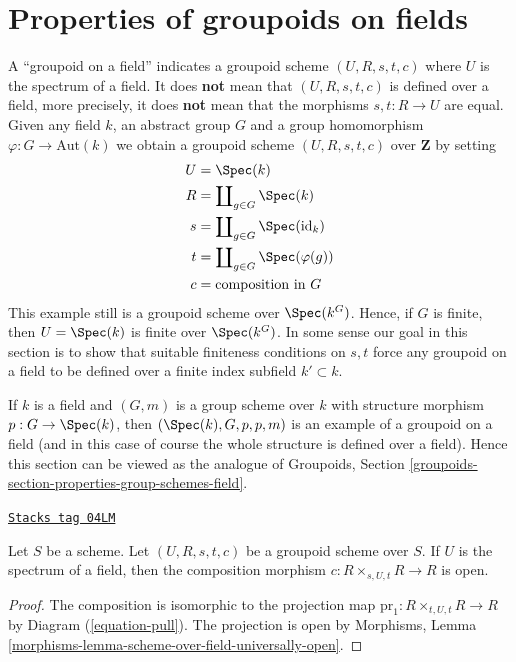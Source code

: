 \section{Properties of groupoids on fields}
\label{more-groupoids-section-properties-groupoids-on-fields}
A ``groupoid on a field'' indicates a groupoid scheme $(U, R, s, t, c)$
where $U$ is the spectrum of a field. It does {\bf not} mean that
$(U, R, s, t, c)$ is defined over a field, more precisely, it does
{\bf not} mean that the morphisms $s, t : R \to U$ are equal.
Given any field $k$, an abstract group $G$ and a group homomorphism
$\varphi : G \to \text{Aut}(k)$ we obtain a groupoid scheme
$(U, R, s, t, c)$ over $\mathbf{Z}$ by setting
\begin{align*}
U & = \Spec(k) \\
R & = \coprod\nolimits_{g \in G} \Spec(k) \\
s & = \coprod\nolimits_{g \in G} \Spec(\text{id}_k) \\
t & = \coprod\nolimits_{g \in G} \Spec(\varphi(g)) \\
c & = \text{composition in }G
\end{align*}
This example still is a groupoid scheme over $\Spec(k^G)$.
Hence, if $G$ is finite, then $U = \Spec(k)$ is finite over
$\Spec(k^G)$.
In some sense our goal in this section is to show that suitable
finiteness conditions on $s, t$ force any groupoid on a field
to be defined over a finite index subfield $k' \subset k$.

\medskip\noindent
If $k$ is a field and $(G, m)$ is a group scheme over $k$ with structure
morphism $p : G \to \Spec(k)$, then $(\Spec(k), G, p, p, m)$
is an example of a groupoid on a field (and in this case of course the whole
structure is defined over a field). Hence this section can be viewed as the
analogue of
Groupoids, Section \ref{groupoids-section-properties-group-schemes-field}.

\begin{lemma}
\label{more-groupoids-lemma-groupoid-on-field-open-multiplication}
\href{https://stacks.math.columbia.edu/tag/04LM}{\texttt{Stacks tag 04LM}}

Let $S$ be a scheme. Let $(U, R, s, t, c)$ be a groupoid scheme
over $S$. If $U$ is the spectrum of a field, then the composition
morphism $c : R \times_{s, U, t} R \to R$ is open.
\end{lemma}

\begin{proof}
The composition is isomorphic to the projection map
$\text{pr}_1 : R \times_{t, U, t} R \to R$ by
Diagram (\ref{equation-pull}).
The projection is open by
Morphisms, Lemma \ref{morphisms-lemma-scheme-over-field-universally-open}.
\end{proof}

